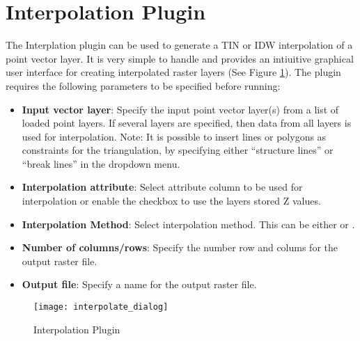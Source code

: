 
\section{Interpolation Plugin}\label{sec:interpol}


The Interplation plugin can be used to generate a TIN or IDW interpolation of a 
point vector layer. It is very simple to handle and provides an intiuitive graphical 
user interface for creating interpolated raster layers (See Figure \ref{fig:interpolation_dialog}).
The plugin requires the following parameters to be specified before running:

\begin{itemize}[label=--]
\item \textbf{Input vector layer}: Specify the input point vector layer(s) from a list of loaded
point layers. If several layers are specified, then data from all layers is used for
interpolation. Note: It is possible to insert lines or polygons as constraints for the
triangulation, by specifying either ``structure lines'' or ``break lines'' in the
 dropdown menu.
\item \textbf{Interpolation attribute}: Select attribute column to be used for interpolation or 
enable the  checkbox to use the layers stored Z values.
\item \textbf{Interpolation Method}: Select interpolation method. This can be either  or .
\item \textbf{Number of columns/rows}: Specify the number row and colums for the output raster file.
\item \textbf{Output file}: Specify a name for the output raster file.
\end{itemize}

\begin{figure}[ht]
   \centering
   \texttt{[image: interpolate\_dialog]}
   \caption{Interpolation Plugin \nixcaption}\label{fig:interpolation_dialog}
\end{figure}

\label{interpolation_usage}

